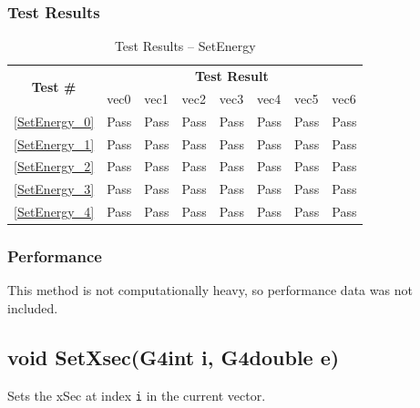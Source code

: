 \documentclass[12pt]{article}
\begin{document}
	\subsubsection{Test Results}
		\begin{table}[H]
		\centering
		\caption{Test Results -- SetEnergy}\label{SetEnergy_acc}
		\begin{tabular}{clllllll}
		\toprule
		\multirow{2}{*}{\bf Test \#} & \multicolumn{7}{c}{\bf Test Result}\\
		& vec0 & vec1 & vec2 & vec3 & vec4 & vec5 & vec6\\\midrule
		\ref{SetEnergy_0} & Pass & Pass & Pass & Pass & Pass & Pass & Pass\\
		\ref{SetEnergy_1} & Pass & Pass & Pass & Pass & Pass & Pass & Pass\\
		\ref{SetEnergy_2} & Pass & Pass & Pass & Pass & Pass & Pass & Pass\\
		\ref{SetEnergy_3} & Pass & Pass & Pass & Pass & Pass & Pass & Pass\\
		\ref{SetEnergy_4} & Pass & Pass & Pass & Pass & Pass & Pass & Pass\\
		\bottomrule
		\end{tabular}
		\end{table}

	\subsubsection{Performance}
		This method is not computationally heavy, so performance data was not included.

\subsection{void SetXsec(G4int i, G4double e)}
	
	Sets the xSec at index \texttt{i} in the current vector. 
	
\end{document}
